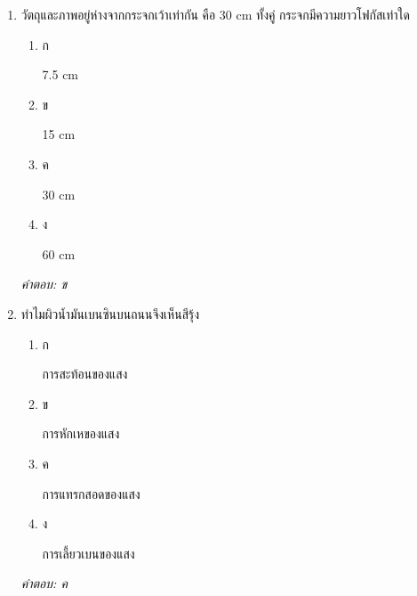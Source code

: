 \documentclass[12pt]{article}
\begin{document}
\begin{enumerate}[label=\arabic*., itemsep=0.5\baselineskip, topsep=0.5\baselineskip, leftmargin=*]
\item วัตถุและภาพอยู่ห่างจากกระจกเว้าเท่ากัน คือ 30 cm ทั้งคู่ กระจกมีความยาวโฟกัสเท่าใด
\begin{enumerate}[label=\alph*)., itemsep=0.3\baselineskip, topsep=0.3\baselineskip]
\item ก\ 
\begin{minipage}[t]{0.9\linewidth}
\raggedright 7.5 cm
\end{minipage}
\item ข\ 
\begin{minipage}[t]{0.9\linewidth}
\raggedright 15 cm
\end{minipage}
\item ค\ 
\begin{minipage}[t]{0.9\linewidth}
\raggedright 30 cm
\end{minipage}
\item ง\ 
\begin{minipage}[t]{0.9\linewidth}
\raggedright 60 cm
\end{minipage}
\end{enumerate}
\vspace{-0.3\baselineskip}
\begin{small}
\textit{คำตอบ: ข}
\end{small}

\item ทำไมผิวน้ำมันเบนซินบนถนนจึงเห็นสีรุ้ง
\begin{enumerate}[label=\alph*)., itemsep=0.3\baselineskip, topsep=0.3\baselineskip]
\item ก\ 
\begin{minipage}[t]{0.9\linewidth}
\raggedright การสะท้อนของแสง
\end{minipage}
\item ข\ 
\begin{minipage}[t]{0.9\linewidth}
\raggedright การหักเหของแสง
\end{minipage}
\item ค\ 
\begin{minipage}[t]{0.9\linewidth}
\raggedright การแทรกสอดของแสง
\end{minipage}
\item ง\ 
\begin{minipage}[t]{0.9\linewidth}
\raggedright การเลี้ยวเบนของแสง
\end{minipage}
\end{enumerate}
\vspace{-0.3\baselineskip}
\begin{small}
\textit{คำตอบ: ค}
\end{small}


\end{enumerate}
\end{document}

